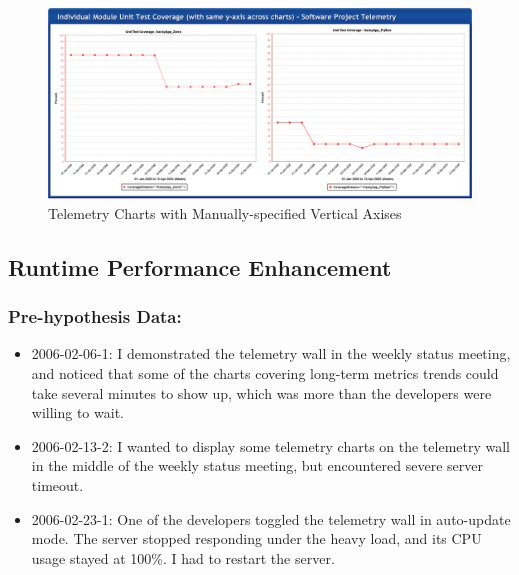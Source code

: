 \begin{figure}[p]
  \center
  \includegraphics[width=1.00\textwidth]{figures/CSDL-FixedYAxis}
  \caption{Telemetry Charts with Manually-specified Vertical Axises} 
  \label{fig:CSDL-FixedYAxis}
\end{figure}











\clearpage
\subsection{Runtime Performance Enhancement}
\label{EvaluationInCSDL:EventsDescription:Performance}

\subsubsection{Pre-hypothesis Data:}
\begin{itemize}
  \setlength{\itemsep}{0pt}
  \setlength{\parskip}{0pt}
  \item 2006-02-06-1: I demonstrated the telemetry wall in the weekly status meeting, and noticed that some of the charts covering long-term metrics trends could take several minutes to show up, which was more than the developers were willing to wait.
  \item 2006-02-13-2: I wanted to display some telemetry charts on the telemetry wall in the middle of the weekly status meeting, but encountered severe server timeout.
  \item 2006-02-23-1: One of the developers toggled the telemetry wall in auto-update mode. The server stopped responding under the heavy load, and its CPU usage stayed at 100\%. I had to restart the server.
\end{itemize}

